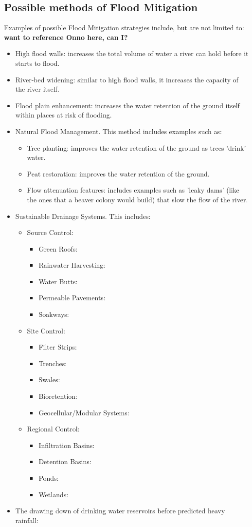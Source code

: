 \documentclass[11 pt, a4paper]{article}
\begin{document}
\subsection{Possible methods of Flood Mitigation}
Examples of possible Flood Mitigation strategies include, but are not limited to:\\
\textbf{want to reference Onno here, can I?}
\begin{itemize}
\item High flood walls: increases the total volume of water a river can hold before it starts to flood.
\item River-bed widening: similar to high flood walls, it increases the capacity of the river itself.
\item Flood plain enhancement: increases the water retention of the ground itself within places at risk of flooding.
\item Natural Flood Management. This method includes examples such as:
\begin{itemize}
\item Tree planting:  improves the water retention of the ground as trees 'drink' water.
\item Peat restoration: improves the water retention of the ground.
\item Flow attenuation features: includes examples such as 'leaky dams' (like the ones that a beaver colony would build) that slow the flow of the river.
\end{itemize}
\item Sustainable Drainage Systems. This includes: \cite{3}
\begin{itemize}
\item Source Control:
\begin{itemize}
\item Green Roofs:
\item Rainwater Harvesting:
\item Water Butts:
\item Permeable Pavements:
\item Soakways:
\end{itemize}
\item Site Control:
\begin{itemize}
\item Filter Strips:
\item Trenches:
\item Swales:
\item Bioretention:
\item Geocellular/Modular Systems:
\end{itemize}
\item Regional Control:
\begin{itemize}
\item Infiltration Basins:
\item Detention Basins:
\item Ponds:
\item Wetlands:
\end{itemize}
\end{itemize}
\item The drawing down of drinking water reservoirs before predicted heavy rainfall:
\end{itemize}
\end{document}
